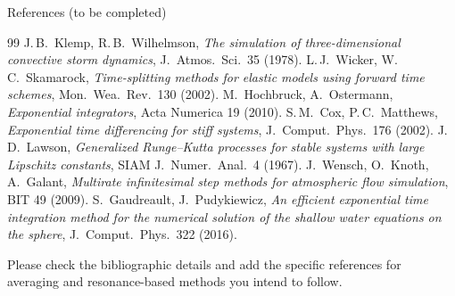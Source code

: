 \documentclass[aspectratio=169,10pt]{beamer}
\begin{document}
	\begin{frame}[allowframebreaks]{References (to be completed)}
		\footnotesize
		\begin{thebibliography}{99}
			 J.\,B.\ Klemp, R.\,B.\ Wilhelmson, \emph{The simulation of three-dimensional convective storm dynamics}, J.\ Atmos.\ Sci.\ 35 (1978).
			 L.\,J.\ Wicker, W.\,C.\ Skamarock, \emph{Time-splitting methods for elastic models using forward time schemes}, Mon.\ Wea.\ Rev.\ 130 (2002).
			 M.\ Hochbruck, A.\ Ostermann, \emph{Exponential integrators}, Acta Numerica 19 (2010).
			 S.\,M.\ Cox, P.\,C.\ Matthews, \emph{Exponential time differencing for stiff systems}, J.\ Comput.\ Phys.\ 176 (2002).
			 J.\,D.\ Lawson, \emph{Generalized Runge--Kutta processes for stable systems with large Lipschitz constants}, SIAM J.\ Numer.\ Anal.\ 4 (1967).
			 J.\ Wensch, O.\ Knoth, A.\ Galant, \emph{Multirate infinitesimal step methods for atmospheric flow simulation}, BIT 49 (2009).
			 S.\ Gaudreault, J.\ Pudykiewicz, \emph{An efficient exponential time integration method for the numerical solution of the shallow water equations on the sphere}, J.\ Comput.\ Phys.\ 322 (2016).
		\end{thebibliography}
		{\scriptsize Please check the bibliographic details and add the specific references for averaging and resonance-based methods you intend to follow.}
	\end{frame}
	
\end{document}
